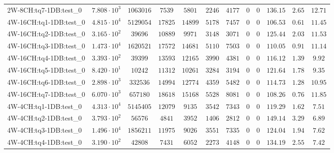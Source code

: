 \begin{tabular}{|l|c|c|c|c|c|c|c|c|c|c|c|}
2W-8CH:tq7-1DB:test\_0   & $ 7.808 \cdot 10^{3} $ & $ 1063016   $ & $ 7539    $ & $ 5801   $ & $ 2246   $ & $ 4177   $ & $ 0 $ & $ 0 $ & $ 136.15      $ & $ 2.65    $ & $ 12.71   $ \\
4W-16CH:tq1-1DB:test\_0  & $ 4.815 \cdot 10^{4} $ & $ 5129054   $ & $ 17825   $ & $ 14899  $ & $ 5178   $ & $ 7457   $ & $ 0 $ & $ 0 $ & $ 106.53      $ & $ 0.61    $ & $ 11.45   $ \\
4W-16CH:tq2-1DB:test\_0  & $ 3.165 \cdot 10^{2} $ & $ 39696     $ & $ 10889   $ & $ 9971   $ & $ 3148   $ & $ 3071   $ & $ 0 $ & $ 0 $ & $ 125.44      $ & $ 2.03    $ & $ 11.53   $ \\
4W-16CH:tq3-1DB:test\_0  & $ 1.473 \cdot 10^{4} $ & $ 1620521   $ & $ 17572   $ & $ 14681  $ & $ 5110   $ & $ 7503   $ & $ 0 $ & $ 0 $ & $ 110.05      $ & $ 0.91    $ & $ 11.14   $ \\
4W-16CH:tq4-1DB:test\_0  & $ 3.393 \cdot 10^{2} $ & $ 39399     $ & $ 13593   $ & $ 12165  $ & $ 3990   $ & $ 4381   $ & $ 0 $ & $ 0 $ & $ 116.12      $ & $ 1.39    $ & $ 9.92    $ \\
4W-16CH:tq5-1DB:test\_0  & $ 8.420 \cdot 10^{1} $ & $ 10242     $ & $ 11312   $ & $ 10261  $ & $ 3284   $ & $ 3194   $ & $ 0 $ & $ 0 $ & $ 121.64      $ & $ 1.78    $ & $ 9.35    $ \\
4W-16CH:tq6-1DB:test\_0  & $ 2.898 \cdot 10^{3} $ & $ 332536    $ & $ 14994   $ & $ 12774  $ & $ 4359   $ & $ 5482   $ & $ 0 $ & $ 0 $ & $ 114.73      $ & $ 1.28    $ & $ 10.95   $ \\
4W-16CH:tq7-1DB:test\_0  & $ 6.070 \cdot 10^{3} $ & $ 657180    $ & $ 18618   $ & $ 15168  $ & $ 5528   $ & $ 8081   $ & $ 0 $ & $ 0 $ & $ 108.26      $ & $ 0.76    $ & $ 11.85   $ \\
4W-4CH:tq1-1DB:test\_0   & $ 4.313 \cdot 10^{4} $ & $ 5145405   $ & $ 12079   $ & $ 9135   $ & $ 3542   $ & $ 7343   $ & $ 0 $ & $ 0 $ & $ 119.29      $ & $ 1.62    $ & $ 7.51    $ \\
4W-4CH:tq2-1DB:test\_0   & $ 3.793 \cdot 10^{2} $ & $ 56576     $ & $ 4841    $ & $ 3952   $ & $ 1406   $ & $ 2812   $ & $ 0 $ & $ 0 $ & $ 149.14      $ & $ 3.29    $ & $ 6.89    $ \\
4W-4CH:tq3-1DB:test\_0   & $ 1.496 \cdot 10^{4} $ & $ 1856211   $ & $ 11975   $ & $ 9026   $ & $ 3551   $ & $ 7335   $ & $ 0 $ & $ 0 $ & $ 124.04      $ & $ 1.94    $ & $ 7.62    $ \\
4W-4CH:tq4-1DB:test\_0   & $ 3.190 \cdot 10^{2} $ & $ 42808     $ & $ 7431    $ & $ 6052   $ & $ 2273   $ & $ 4148   $ & $ 0 $ & $ 0 $ & $ 134.19      $ & $ 2.55    $ & $ 7.42    $ \\

\end{tabular}
